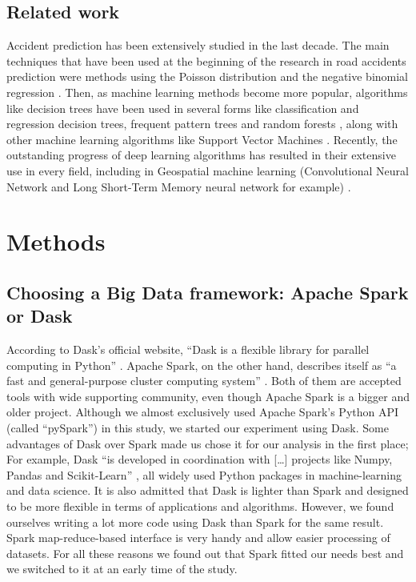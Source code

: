 \documentclass[conference]{IEEEtran}
\begin{document}
\subsection{Related work}
Accident prediction has been extensively studied in the last decade. The main techniques that have been used at the beginning of the research in road accidents prediction were methods using the Poisson distribution and the negative binomial regression \cite{Chang2005}. Then, as machine learning methods become more popular, algorithms like decision trees have been used in several forms like classification and regression decision trees, frequent pattern trees and random forests
\cite{Chang2005, Theofilatos2017, Abellan2013, Lin2015}, along with other machine learning algorithms like Support Vector Machines \cite{LI20081611}. Recently, the outstanding progress of deep learning algorithms has resulted in their extensive use in every field, including in Geospatial machine learning (Convolutional Neural Network and Long Short-Term Memory neural network for example) \cite{Yuan2018, QChen2016}.
\section{Methods}
\subsection{Choosing a Big Data framework: Apache Spark or Dask}
According to Dask’s official website, “Dask is a flexible library for parallel computing in Python” \cite{dask}. Apache Spark, on the other hand, describes itself as “a fast and general-purpose cluster computing system” \cite{spark}. Both of them are accepted tools with wide supporting community, even though Apache Spark is a bigger and older project. Although we almost exclusively used Apache Spark’s Python API (called “pySpark”) in this study, we started our experiment using Dask. Some advantages of Dask over Spark made us chose it for our analysis in the first place; For example, Dask “is developed in coordination with […] projects like Numpy, Pandas and Scikit-Learn” \cite{dask}, all widely used Python packages in machine-learning and data science. It is also admitted that Dask is lighter than Spark and designed to be more flexible in terms of applications and algorithms. However, we found ourselves writing a lot more code using Dask than Spark for the same result. Spark map-reduce-based interface is very handy and allow easier processing of datasets. For all these reasons we found out that Spark fitted our needs best and we switched to it at an early time of the study.
\end{document}
